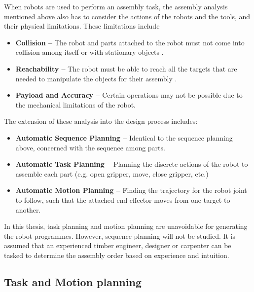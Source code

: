When robots are used to perform an assembly task, the assembly analysis mentioned above also has to consider the actions of the robots and the tools, and their physical limitations. These limitations include

\begin{itemize}
    \item \textbf{Collision --} The robot and parts attached to the robot must not come into collision among itself or with stationary objects .

	\item \textbf{Reachability --} The robot must be able to reach all the targets that are needed to manipulate the objects for their assembly .

	\item \textbf{Payload and Accuracy --} Certain operations may not be possible due to the mechanical limitations of the robot.
\end{itemize}

The extension of these analysis into the design process includes:

\begin{itemize}
	\item \textbf{Automatic Sequence Planning --} Identical to the sequence planning above, concerned with the sequence among parts.

	\item \textbf{Automatic Task Planning --} Planning the discrete actions of the robot to assemble each part (e.g. open gripper, move, close gripper, etc.) \parencite{homemdemelloTaskSequencePlanning1989}

	\item \textbf{Automatic Motion Planning --} Finding the trajectory for the robot joint to follow, such that the attached end-effector moves from one target to another. \parencite{lavallePlanningAlgorithms2006}
\end{itemize}

In this thesis, task planning and motion planning are unavoidable for generating the robot programmes. However, sequence planning will not be studied. It is assumed that an experienced timber engineer, designer or carpenter can be tasked to determine the assembly order based on experience and intuition.

\subsection{Task and Motion planning}
\label{subsection:challenges-task-motion-planning}

